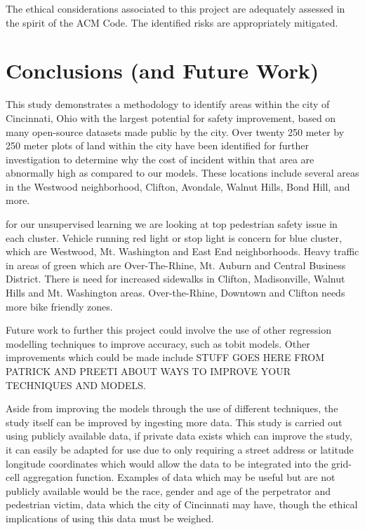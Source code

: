 \documentclass{llncs}
\begin{document}
The ethical considerations associated to this project are adequately assessed in the spirit of the ACM Code. The identified risks are appropriately mitigated.
%
\section{Conclusions (and Future Work)}
%

This study demonstrates a methodology to identify areas within the city of Cincinnati, Ohio with the largest potential for safety improvement, based on many open-source datasets made public by the city. Over twenty 250 meter by 250 meter plots of land within the city have been identified for further investigation to determine why the cost of incident within that area are abnormally high as compared to our models. These locations include several areas in the Westwood neighborhood, Clifton, Avondale, Walnut Hills, Bond Hill, and more. 

for our unsupervised learning we are looking at top pedestrian safety issue in each cluster. Vehicle running red light or stop light is concern for blue cluster, which are Westwood, Mt. Washington and East End neighborhoods.  Heavy traffic in areas of green which are Over-The-Rhine, Mt. Auburn and Central Business District. There is need for increased sidewalks in Clifton, Madisonville, Walnut Hills and Mt. Washington areas. Over-the-Rhine, Downtown and Clifton needs more bike friendly zones.

Future work to further this project could involve the use of other regression modelling techniques to improve accuracy, such as tobit models. Other improvements which could be made include STUFF GOES HERE FROM PATRICK AND PREETI ABOUT WAYS TO IMPROVE YOUR TECHNIQUES AND MODELS.

Aside from improving the models through the use of different techniques, the study itself can be improved by ingesting more data. This study is carried out using publicly available data, if private data exists which can improve the study, it can easily be adapted for use due to only requiring a street address or latitude longitude coordinates which would allow the data to be integrated into the grid-cell aggregation function. Examples of data which may be useful but are not publicly available would be the race, gender and age of the perpetrator and pedestrian victim, data which the city of Cincinnati may have, though the ethical implications of using this data must be weighed. 

%


\end{document}
